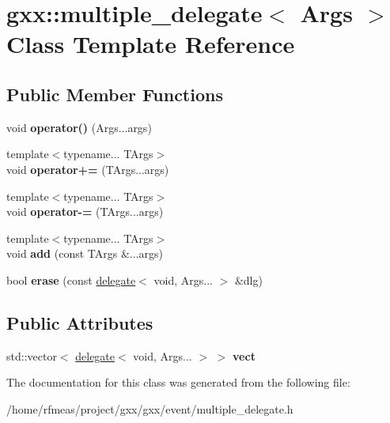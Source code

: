 \hypertarget{classgxx_1_1multiple__delegate}{}\section{gxx\+:\+:multiple\+\_\+delegate$<$ Args $>$ Class Template Reference}
\label{classgxx_1_1multiple__delegate}
\subsection*{Public Member Functions}
\begin{DoxyCompactItemize}
\item 
void {\bfseries operator()} (Args...\+args)\hypertarget{classgxx_1_1multiple__delegate_a70fdc8781fe57007e9d1825b80098225}{}\label{classgxx_1_1multiple__delegate_a70fdc8781fe57007e9d1825b80098225}

\item 
{\footnotesize template$<$typename... T\+Args$>$ }\\void {\bfseries operator+=} (T\+Args...\+args)\hypertarget{classgxx_1_1multiple__delegate_a88a74180310bf17b873f57b65f89c93a}{}\label{classgxx_1_1multiple__delegate_a88a74180310bf17b873f57b65f89c93a}

\item 
{\footnotesize template$<$typename... T\+Args$>$ }\\void {\bfseries operator-\/=} (T\+Args...\+args)\hypertarget{classgxx_1_1multiple__delegate_af8910f42413413e2eb623ff6959f646c}{}\label{classgxx_1_1multiple__delegate_af8910f42413413e2eb623ff6959f646c}

\item 
{\footnotesize template$<$typename... T\+Args$>$ }\\void {\bfseries add} (const T\+Args \&...args)\hypertarget{classgxx_1_1multiple__delegate_ab2f238e1e0d6f594b1a6ffb36defab21}{}\label{classgxx_1_1multiple__delegate_ab2f238e1e0d6f594b1a6ffb36defab21}

\item 
bool {\bfseries erase} (const \hyperlink{classgxx_1_1delegate}{delegate}$<$ void, Args... $>$ \&dlg)\hypertarget{classgxx_1_1multiple__delegate_ac25dd97d54c97775b9792f89162d0b0e}{}\label{classgxx_1_1multiple__delegate_ac25dd97d54c97775b9792f89162d0b0e}

\end{DoxyCompactItemize}
\subsection*{Public Attributes}
\begin{DoxyCompactItemize}
\item 
std\+::vector$<$ \hyperlink{classgxx_1_1delegate}{delegate}$<$ void, Args... $>$ $>$ {\bfseries vect}\hypertarget{classgxx_1_1multiple__delegate_a79db4179be9faf7408373a4f01985054}{}\label{classgxx_1_1multiple__delegate_a79db4179be9faf7408373a4f01985054}

\end{DoxyCompactItemize}


The documentation for this class was generated from the following file\+:\begin{DoxyCompactItemize}
\item 
/home/rfmeas/project/gxx/gxx/event/multiple\+\_\+delegate.\+h\end{DoxyCompactItemize}
